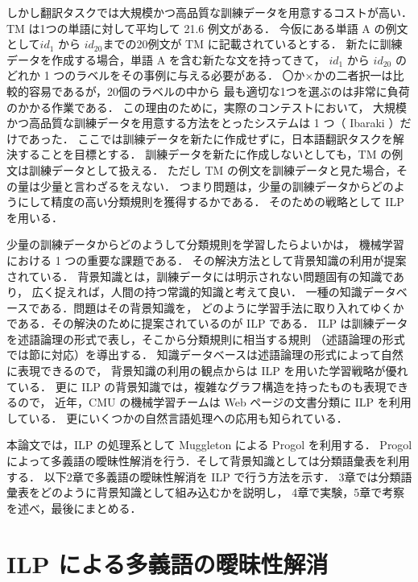 しかし翻訳タスクでは大規模かつ高品質な訓練データを用意するコストが高い．
TM は1つの単語に対して平均して 21.6 例文がある．
今仮にある単語 A の例文として\( id_1 \) から \( id_{20} \)までの20例文が 
TM に記載されているとする．
新たに訓練データを作成する場合，単語 A を含む新たな文を持ってきて，
\( id_1 \) から \( id_{20} \) のどれか 1 つのラベルをその事例に与える必要がある．
〇か×かの二者択一は比較的容易であるが，20個のラベルの中から
最も適切な1つを選ぶのは非常に負荷のかかる作業である．
この理由のために，実際のコンテストにおいて，
大規模かつ高品質な訓練データを用意する方法をとったシステムは 1 つ（ Ibaraki ）だけであった．
ここでは訓練データを新たに作成せずに，日本語翻訳タスクを解決することを目標とする．
訓練データを新たに作成しないとしても，TM の例文は訓練データとして扱える．
ただし TM の例文を訓練データと見た場合，その量は少量と言わざるをえない．
つまり問題は，少量の訓練データからどのようにして精度の高い分類規則を獲得するかである．
そのための戦略として ILP を用いる．

少量の訓練データからどのようして分類規則を学習したらよいかは，
機械学習における 1 つの重要な課題である．
その解決方法として背景知識の利用が提案されている\cite{ipsj-kaisetu}．
背景知識とは，訓練データには明示されない問題固有の知識であり，
広く捉えれば，人間の持つ常識的知識と考えて良い．
一種の知識データベースである．問題はその背景知識を，
どのように学習手法に取り入れてゆくかである．その解決のために提案されているのが ILP である．
ILP は訓練データを述語論理の形式で表し，そこから分類規則に相当する規則
（述語論理の形式では節に対応）を導出する．
知識データベースは述語論理の形式によって自然に表現できるので，
背景知識の利用の観点からは ILP を用いた学習戦略が優れている\cite{furukawa}．
更に ILP の背景知識では，複雑なグラフ構造を持ったものも表現できるので，
近年，CMU の機械学習チームは Web ページの文書分類に ILP を利用している\cite{webkb}．
更にいくつかの自然言語処理への応用も知られている\cite{cohen}\cite{califf}\cite{shimazu}．

本論文では，ILP の処理系として Muggleton による Progol を利用する\cite{muggen2}．
Progol によって多義語の曖昧性解消を行う．そして背景知識としては分類語彙表\cite{bunrui-tab}を利用する．
以下2章で多義語の曖昧性解消を ILP で行う方法を示す．
3章では分類語彙表をどのように背景知識として組み込むかを説明し，
4章で実験，5章で考察を述べ，最後にまとめる．


\section{ILP による多義語の曖昧性解消}


